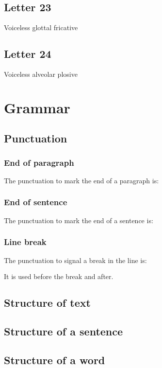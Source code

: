 \documentclass{book}
\newcommand{\display}[1]{\begin{center}\resizebox{2cm}{!}{\texttt{[image: \#1]}}\end{center}}
\begin{document}
\section{Letter 23}
Voiceless glottal fricative

\display{letters/consonants/23.JPG}


\section{Letter 24}
Voiceless alveolar plosive

\display{letters/consonants/24.JPG}



\chapter{Grammar}
\section{Punctuation}
\subsection{End of paragraph} \label{sect:end-of-para}
The punctuation to mark the end of a paragraph is:

\display{punctuation/paragraph-end.png}

\subsection{End of sentence}
The punctuation to mark the end of a sentence is:

\display{punctuation/sentence-end.png}

\subsection{Line break}
The punctuation to signal a break in the line is:

\display{punctuation/line-break.png}

It is used before the break and after.

\section{Structure of text}

\section{Structure of a sentence}

\section{Structure of a word}
\end{document}
